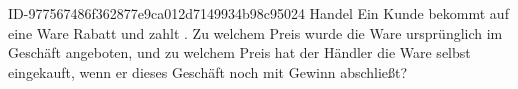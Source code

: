 \begin{exercise}
      {ID-977567486f362877e9ca012d7149934b98c95024}
      {Handel}
  \ifproblem\problem
    Ein Kunde bekommt auf eine Ware  Rabatt und zahlt .
    Zu welchem Preis wurde die Ware ursprünglich im Geschäft angeboten,
    und zu welchem Preis hat der Händler die Ware selbst eingekauft,
    wenn er dieses Geschäft noch mit  Gewinn abschließt?
  \fi
\end{exercise}
